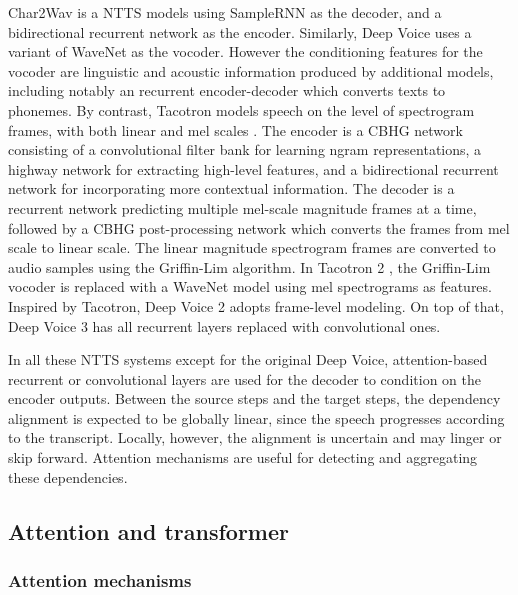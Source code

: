 \documentclass[11pt]{article}
\begin{document}
Char2Wav \parencite{sotelo2017char2wav} is a NTTS models using SampleRNN as the decoder,
and a bidirectional recurrent network as the encoder.
Similarly, Deep Voice \parencite{arik2017deep} uses a variant of WaveNet as the vocoder.
However the conditioning features for the vocoder are linguistic and acoustic information
produced by additional models,
including notably an recurrent encoder-decoder which converts texts to phonemes.
By contrast, Tacotron \parencite{wang2017tacotron} models speech
on the level of spectrogram frames,
with both linear and mel scales \parencite{stevens1937scale}.
The encoder is a CBHG network consisting of
a convolutional filter bank \parencite{qu2016learning} for learning ngram representations,
a highway network \parencite{srivastava2015highway} for extracting high-level features,
and a bidirectional recurrent network for incorporating more contextual information.
The decoder is a recurrent network predicting
multiple mel-scale magnitude frames at a time,
followed by a CBHG post-processing network
which converts the frames from mel scale to linear scale.
The linear magnitude spectrogram frames are converted to audio samples
using the Griffin-Lim algorithm.
In Tacotron 2 \parencite{shen2018natural},
the Griffin-Lim vocoder is replaced with a WaveNet model
using mel spectrograms as features.
Inspired by Tacotron,
Deep Voice 2 \parencite{arik2017deep2} adopts frame-level modeling.
On top of that, Deep Voice 3 \parencite{ping2017deep} has all recurrent layers
replaced with convolutional ones.

In all these NTTS systems except for the original Deep Voice,
attention-based recurrent or convolutional layers are used
for the decoder to condition on the encoder outputs.
Between the source steps and the target steps,
the dependency alignment is expected to be globally linear,
since the speech progresses according to the transcript.
Locally, however, the alignment is uncertain and may linger or skip forward.
Attention mechanisms are useful for detecting and aggregating these dependencies.

\subsection{Attention and transformer}

\subsubsection*{Attention mechanisms}
\end{document}
